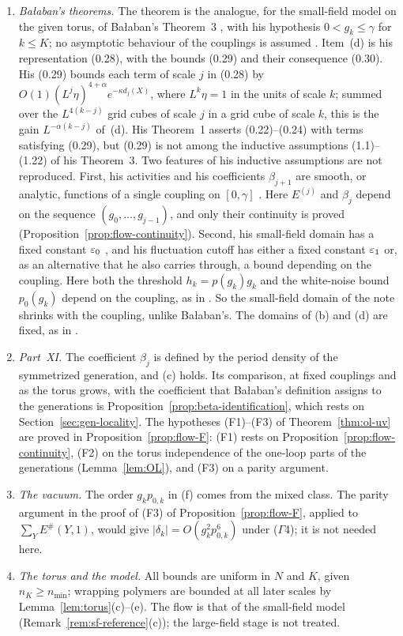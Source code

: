 \begin{remark}\label{rem:sf-flow}
\begin{enumerate}[label=(\alph*)]
\item \emph{Ba\l aban's theorems.} The theorem is the analogue, for the small-field model on the given torus, of Ba\l aban's Theorem~3 \cite{BalYM4I}, with his hypothesis $0<g_k\le\gamma$ for $k\le K$; no asymptotic behaviour of the couplings is assumed \cite[p.~259]{BalYM4I}. Item~(d) is his representation (0.28), with the bounds (0.29) and their consequence (0.30). His (0.29) bounds each term of scale $j$ in (0.28) by $O(1)(L^j\eta)^{4+\alpha}e^{-\kappa d_j(X)}$, where $L^k\eta=1$ in the units of scale $k$; summed over the $L^{4(k-j)}$ grid cubes of scale $j$ in a grid cube of scale $k$, this is the gain $L^{-\alpha(k-j)}$ of~(d). His Theorem~1 asserts (0.22)--(0.24) with terms satisfying (0.29), but (0.29) is not among the inductive assumptions (1.1)--(1.22) of his Theorem~3. Two features of his inductive assumptions are not reproduced. First, his activities and his coefficients $\beta_{j+1}$ are smooth, or analytic, functions of a single coupling on $[0,\gamma]$ \cite[pp.~263--264]{BalYM4I}. Here $E^{(j)}$ and $\beta_j$ depend on the sequence $(g_0,\dots,g_{j-1})$, and only their continuity is proved (Proposition~\ref{prop:flow-continuity}). Second, his small-field domain has a fixed constant $\varepsilon_0$ \cite[p.~259]{BalYM4I}, and his fluctuation cutoff \cite[(2.9)]{BalYM4I} has either a fixed constant $\varepsilon_1$ or, as an alternative that he also carries through, a bound depending on the coupling. Here both the threshold $h_k=p(g_k)g_k$ and the white-noise bound $p_0(g_k)$ depend on the coupling, as in \cite{DimockI}. So the small-field domain of the note shrinks with the coupling, unlike Ba\l aban's. The domains of (b) and (d) are fixed, as in \cite[(1.11)--(1.16)]{BalYM4I}.
\item \emph{Part~XI.} The coefficient $\beta_j$ is defined by the period density of the symmetrized generation, and (c) holds. Its comparison, at fixed couplings and as the torus grows, with the coefficient that Ba\l aban's definition \cite[(1.20)--(1.22)]{BalYM4I} assigns to the generations is Proposition~\ref{prop:beta-identification}, which rests on Section~\ref{sec:gen-locality}. The hypotheses (F1)--(F3) of Theorem~\ref{thm:ol-uv} are proved in Proposition~\ref{prop:flow-F}: (F1) rests on Proposition~\ref{prop:flow-continuity}, (F2) on the torus independence of the one-loop parts of the generations (Lemma~\ref{lem:OL}), and (F3) on a parity argument.
\item \emph{The vacuum.} The order $g_kp_{0,k}$ in (f) comes from the mixed class. The parity argument in the proof of (F3) of Proposition~\ref{prop:flow-F}, applied to $\sum_YE^\#(Y,1)$, would give $|\delta_k|=O(g_k^2p_{0,k}^6)$ under ($\Gamma$4); it is not needed here.
\item \emph{The torus and the model.} All bounds are uniform in $N$ and $K$, given $n_K\ge n_{\min}$; wrapping polymers are bounded at all later scales by Lemma~\ref{lem:torus}(c)--(e). The flow is that of the small-field model (Remark~\ref{rem:sf-reference}(c)); the large-field stage is not treated.
\end{enumerate}
\end{remark}
